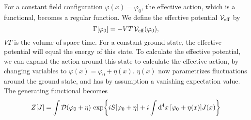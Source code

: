For a constant field configuration $\varphi(x) = \varphi_0$, the effective action, which is a functional, becomes a regular function.
We define the effective potential $\mathcal{V}_{\mathrm{eff}}$ by
\begin{equation}
    \label{definition effective potential}
    \Gamma[\varphi_0] = - V T \, \mathcal{V}_{\mathrm{eff}}(\varphi_0),
\end{equation}
$VT$ is the volume of space-time.
For a constant ground state, the effective potential will equal the energy of this state.
To calculate the effective potential, we can expand the action around this state to calculate the effective action,
by changing variables to $\varphi(x) = \varphi_0 + \eta(x)$.
$\eta(x)$ now parametrizes fluctuations around the ground state, and has by assumption a vanishing expectation value.
The generating functional becomes
\begin{align}
    Z[J] 
    = \int \mathcal{D} (\varphi_0 + \eta) \, 
    \exp{i S[\varphi_0 + \eta] + i \int \dd^4 x\, [\varphi_0 + \eta(x)] J(x) }
\end{align}

